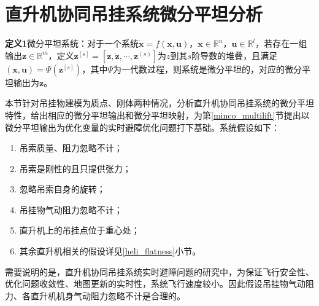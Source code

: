 \section{直升机协同吊挂系统微分平坦分析}\label{flatness_total}
\textbf{定义1}微分平坦系统\cite{murray1995differential}：对于一个系统$\dot{\boldsymbol{x}} = f(\boldsymbol{x},\boldsymbol{u})$，$\boldsymbol{x}\in \mathbb{R}^n$，$\boldsymbol{u} \in \mathbb{R}^l$，若存在一组输出$\boldsymbol{z} \in \mathbb{R}^m$，定义$\boldsymbol{z}^{[s]} = [\boldsymbol{z}, \dot{\boldsymbol{z}}, \cdots, \boldsymbol{z}^{(s)}]$为$z$到其$s$阶导数的堆叠，且满足$({\boldsymbol{x}}, {\boldsymbol{u}}) = \Psi({\boldsymbol{z}}^{[s]})$，其中$\Psi$为一代数过程，则系统是微分平坦的，对应的微分平坦输出为$\boldsymbol{z}$。

本节针对吊挂物建模为质点、刚体两种情况，分析直升机协同吊挂系统的微分平坦特性，给出相应的微分平坦输出和微分平坦映射，为第\ref{minco_multilift}节提出以微分平坦输出为优化变量的实时避障优化问题打下基础。系统假设如下：
\begin{enumerate}
    \item  吊索质量、阻力忽略不计；
    \item  吊索是刚性的且只提供张力；
    \item  忽略吊索自身的旋转；
    \item  吊挂物气动阻力忽略不计；
    \item  直升机上的吊挂点位于重心处；
    \item  其余直升机相关的假设详见\ref{heli_flatness}小节。
\end{enumerate}

需要说明的是，直升机协同吊挂系统实时避障问题的研究中，为保证飞行安全性、优化问题收敛性、地图更新的实时性，系统飞行速度较小。因此假设吊挂物气动阻力、各直升机机身气动阻力忽略不计是合理的。

